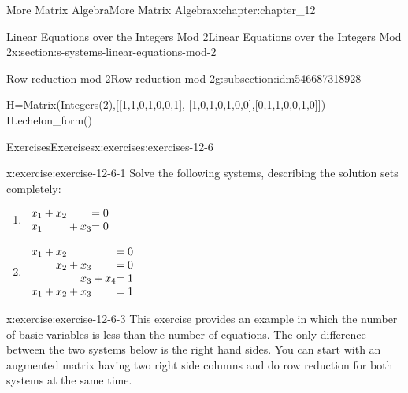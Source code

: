 \documentclass[oneside,10pt,]{book}
\numberwithin{equation}{section}
\begin{document}
\begin{chapterptx}{More Matrix Algebra}{}{More Matrix Algebra}{}{}{x:chapter:chapter_12}
\begin{sectionptx}{Linear Equations over the Integers Mod 2}{}{Linear Equations over the Integers Mod 2}{}{}{x:section:s-systems-linear-equations-mod-2}
\begin{subsectionptx}{Row reduction mod 2}{}{Row reduction mod 2}{}{}{g:subsection:idm546687318928}
\begin{sageinput}
H=Matrix(Integers(2),[[1,1,0,1,0,0,1],
   [1,0,1,0,1,0,0],[0,1,1,0,0,1,0]])
H.echelon_form()
\end{sageinput}
\begin{sageoutput}
[1 0 1 0 1 0 0]
[0 1 1 0 0 1 0]
[0 0 0 1 1 1 1]
\end{sageoutput}
\end{subsectionptx}
%
%
\typeout{************************************************}
\typeout{************************************************}
%
\begin{exercises-subsection}{Exercises}{}{Exercises}{}{}{x:exercises:exercises-12-6}
\begin{divisionexercise}{1}{}{}{x:exercise:exercise-12-6-1}%
Solve the following systems, describing the solution sets completely:%
\begin{enumerate}[label=(\alph*)]
\item{}\(\begin{array}{r@{}r@{}r@{}r@{}r@{}r@{}}
x_1  & {}+{} & x_2 &       &     & = 0 \\
x_1  &       &     & {}+{} & x_3 & = 0 \\
\end{array} \)%
\item{}\(\begin{array}{r@{}r@{}r@{}r@{}r@{}r@{}r@{}r@{}}
x_1  & {}+{} & x_2 &       &    &       &        & = 0 \\
&       & x_2 & {}+{} & x_3&       &       &   = 0\\
&       &     &       & x_3& {}+{} & x_4   & = 1 \\
x_1  & {}+{} & x_2 & {}+{} & x_3&       &        &  = 1 \\
\end{array} \)%
\end{enumerate}
%
\end{divisionexercise}%
\begin{divisionexercise}{2}{}{}{x:exercise:exercise-12-6-3}%
This exercise provides an example in which the number of basic variables is less than the number of equations. The only difference between the two systems below is the right hand sides.  You can start with an augmented matrix having two right side columns and do row reduction for both systems at the same time.%
\begin{multicols}{2}
\end{multicols}
\end{divisionexercise}
\end{exercises-subsection}
\end{sectionptx}
\end{chapterptx}
\end{document}
